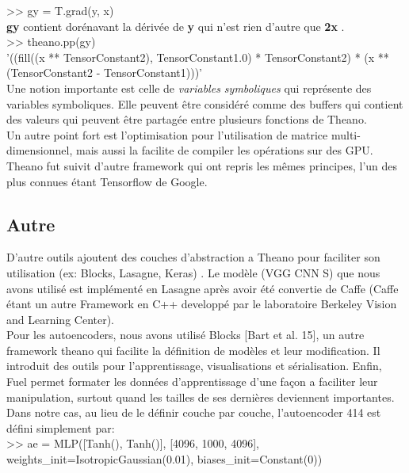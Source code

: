 >> gy = T.grad(y, x)\\

\textbf{gy} contient dorénavant la dérivée de \textbf{y} qui n'est rien d'autre que \textbf{2x} .\\

>> theano.pp(gy)\\
 '((fill((x ** TensorConstant{2}), TensorConstant{1.0}) * TensorConstant{2}) * (x ** (TensorConstant{2} - TensorConstant{1})))'\\
 
Une notion importante est celle de \textit{variables symboliques} qui représente des variables symboliques. Elle peuvent être considéré comme des buffers qui contient des valeurs qui peuvent être partagée entre plusieurs fonctions de Theano.\\

Un autre point fort est l'optimisation pour l'utilisation de matrice multi-dimensionnel, mais aussi la facilite de compiler les opérations sur des GPU.\\

Theano fut suivit d'autre framework qui ont repris les mêmes principes, l'un des plus connues étant Tensorflow de Google.

\subsection{Autre}
D'autre outils ajoutent des couches d'abstraction a Theano pour faciliter son utilisation (ex: Blocks, Lasagne, Keras) .
Le modèle (VGG CNN S) que nous avons utilisé est implémenté en Lasagne après avoir été convertie de Caffe (Caffe étant un autre Framework en C++ developpé par le laboratoire Berkeley Vision and Learning Center).\\

Pour les autoencoders, nous avons utilisé Blocks [Bart et al. 15], un autre framework theano qui facilite la définition de modèles et leur modification. Il introduit des outils pour l'apprentissage, visualisations et sérialisation. Enfin, Fuel permet formater les données d'apprentissage d'une façon a faciliter leur manipulation, surtout quand les tailles de ses dernières deviennent importantes.\\

Dans notre cas, au lieu de le définir couche par couche, l'autoencoder 414 est défini simplement par:\\

>> ae = MLP([Tanh(), Tanh()], [4096, 1000, 4096],
              weights_init=IsotropicGaussian(0.01),
              biases_init=Constant(0))\\
              

